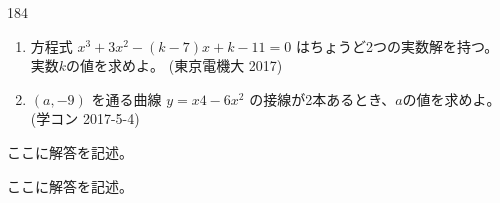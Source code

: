 \begin{thm}{184}{}{}
 \begin{enumerate}
  \item 方程式 $x^3+3x^2-(k-7)x+k-11=0$ はちょうど2つの実数解を持つ。実数$k$の値を求めよ。  (東京電機大 2017)
  \item $(a,-9)$ を通る曲線 $y=x4-6x^2$ の接線が2本あるとき、$a$の値を求めよ。  (学コン 2017-5-4)
 \end{enumerate}
\end{thm}

ここに解答を記述。

ここに解答を記述。